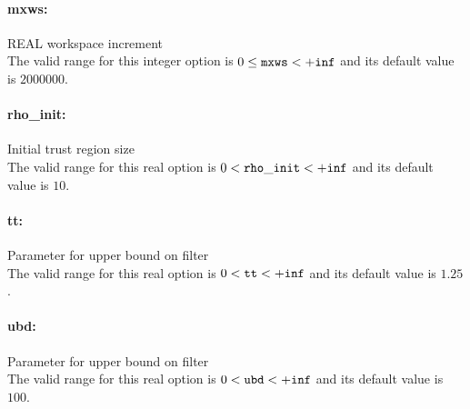 \paragraph{mxws:}\label{sec:mxws} REAL workspace increment $\;$ \\
 The valid range for this integer option is
$0 \le {\tt mxws } <  {\tt +inf}$
and its default value is $2000000$.


\paragraph{rho\_init:}\label{sec:rho_init} Initial trust region size $\;$ \\
 The valid range for this real option is 
$0 <  {\tt rho\_init } <  {\tt +inf}$
and its default value is $10$.


\paragraph{tt:}\label{sec:tt} Parameter for upper bound on filter $\;$ \\
 The valid range for this real option is 
$0 <  {\tt tt } <  {\tt +inf}$
and its default value is $1.25$.


\paragraph{ubd:}\label{sec:ubd} Parameter for upper bound on filter $\;$ \\
 The valid range for this real option is 
$0 <  {\tt ubd } <  {\tt +inf}$
and its default value is $100$.


